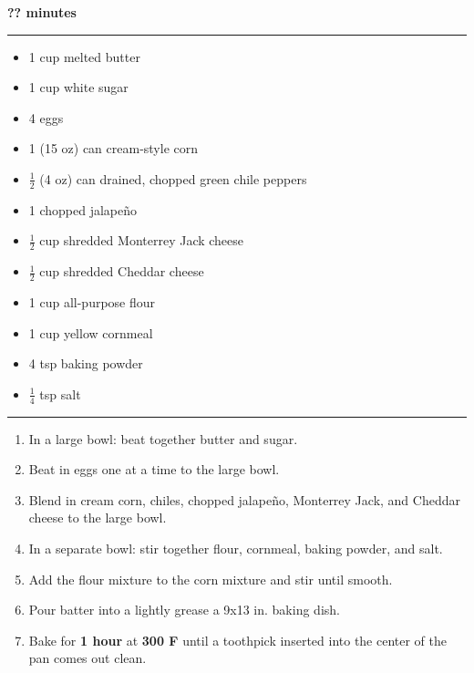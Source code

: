  \hfill {\large \textbf{?? minutes}}

\vspace{15pt} \hrule \vspace{15pt}
\begin{itemize}
	\item 1 cup melted butter
	\item 1 cup white sugar
	\item 4 eggs
	\item 1 (15 oz) can cream-style corn
	\item $\frac{1}{2}$ (4 oz) can drained, chopped green chile peppers
	\item 1 chopped jalapeño
	\item $\frac{1}{2}$ cup shredded Monterrey Jack cheese
	\item $\frac{1}{2}$ cup shredded Cheddar cheese
	\item 1 cup all-purpose flour
	\item 1 cup yellow cornmeal
	\item 4 tsp baking powder
	\item $\frac{1}{4}$ tsp salt
\end{itemize}

\vspace{15pt} \hrule \vspace{15pt}
\begin{enumerate}
	\item In a large bowl: beat together butter and sugar.
	\item Beat in eggs one at a time to the large bowl.
	\item Blend in cream corn, chiles, chopped jalapeño, Monterrey Jack, and Cheddar cheese to the large bowl.
	\item In a separate bowl: stir together flour, cornmeal, baking powder, and salt.
	\item Add the flour mixture to the corn mixture and stir until smooth.
	\item Pour batter into a lightly grease a 9x13 in. baking dish.
	\item Bake for \textbf{1 hour} at \textbf{300 F} until a toothpick inserted into the center of the pan comes out clean.
\end{enumerate}
